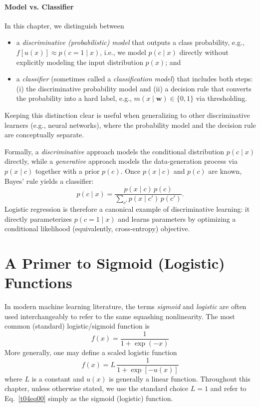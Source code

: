 \documentclass[12pt]{article}
\begin{document}
\paragraph{Model vs. Classifier}
In this chapter, we distinguish between
\begin{itemize}
    \item a \emph{discriminative (probabilistic) model} that outputs a class probability, e.g., $f[u(x)] \approx p(c=1 \mid x)$, i.e., we model $p(c \mid x)$ directly without explicitly modeling the input distribution $p(x)$; and
    \item a \emph{classifier} (sometimes called a \emph{classification model}) that includes both steps: (i) the discriminative probability model and (ii) a decision rule that converts the probability into a hard label, e.g., $m(x \mid \bm{w}) \in \{0,1\}$ via thresholding.
\end{itemize}
Keeping this distinction clear is useful when generalizing to other discriminative learners (e.g., neural networks), where the probability model and the decision rule are conceptually separate.


Formally, a \emph{discriminative} approach models the conditional distribution $p(c \mid x)$ directly, while a \emph{generative} approach models the data-generation process via $p(x \mid c)$ together with a prior $p(c)$.
Once $p(x \mid c)$ and $p(c)$ are known, Bayes' rule yields a classifier:
 \[
p(c \mid x) =  \frac{p(x \mid c)\,p(c)}{ \sum_{c'} p(x \mid c')\,p(c')}.
 \]
Logistic regression is therefore a canonical example of discriminative learning: it directly parameterizes $p(c=1 \mid x)$ and learns parameters by optimizing a conditional likelihood (equivalently, cross-entropy) objective.


\section{A Primer to Sigmoid (Logistic) Functions}
In modern machine learning literature, the terms \emph{sigmoid} and \emph{logistic} are often used interchangeably to refer to the same squashing nonlinearity. The most common (standard) logistic/sigmoid function is
\begin{equation}
    f(x) = \frac{1}{1 + \exp(-x)}
    \label{t04eq00}
\end{equation}
More generally, one may define a scaled logistic function
\begin{equation}
    f(x) = L\, \frac{1}{1 + \exp[-u(x)]}
    \label{t04eq01}
\end{equation}
where $L$ is a constant and $u(x)$ is generally a linear function. Throughout this chapter, unless otherwise stated, we use the standard choice $L=1$ and refer to Eq.~\eqref{t04eq00} simply as the sigmoid (logistic) function.
\end{document}
